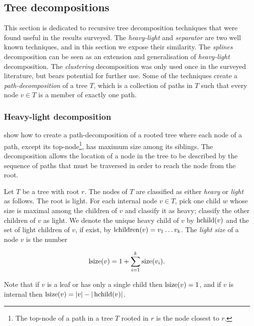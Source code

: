 \subsection{Tree decompositions}\label{section:Tree-decompositions}
This section is dedicated to recursive tree decomposition techniques that were found useful in  the results surveyed.
The \emph{heavy-light} and \emph{separator} are two well known techniques, and in this section we expose their similarity.
The \emph{splines} decomposition can be seen as an extension and generalisation of \emph{heavy-light} decomposition.
The \emph{clustering} decomposition was only used once in the surveyed literature, but bears  potential for further use. Some of the techniques create a  \emph{path-decomposition} of a tree $T$, which is a collection of paths in $T$ such that every node $v \in T$ is a member of exactly one path.


\subsubsection{Heavy-light decomposition}\label{tec:heavylight}
 show how to create a path-decomposition of a rooted tree where each node of a path, except its top-node\footnote{The top-node of a path in a tree $T$ rooted in $r$ is the node closest to $r$.}, has maximum size among its siblings. The decomposition allows the location of a node in the tree to be described by the sequence of paths that must be traversed in order to reach the node from the root. 

Let $T$ be a tree with root $r$. The nodes of $T$ are classified as either \emph{heavy} or \emph{light} as follows. The root is light. For each internal node $v\in T$, pick one child $w$ whose size is maximal among the children of $v$ and classify it as heavy; classify the other children of $v$ as light.  We denote the unique heavy child of $v$ by $\operatorname{hchild}(v)$ and the set of light children of $v$, if exist, by $\operatorname{lchildren}(v)= v_1 \dots v_k$. The \emph{light size} of a node $v$ is the number 

$$ \operatorname{lsize}(v) =  1+\sum_{i=1}^{k} \operatorname{size}(v_i).$$

Note that if $v$ is a leaf or has only a single child then
$\operatorname{lsize}(v)=1$, and if $v$ is internal then 
$\operatorname{lsize}(v)=\vert v \vert - \vert \operatorname{hchild}(v) \vert$.

